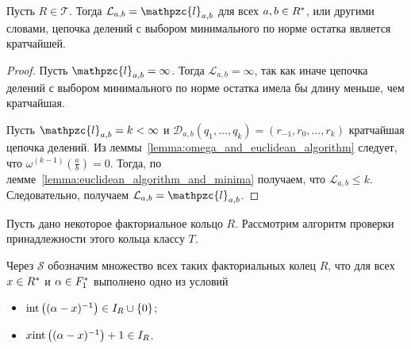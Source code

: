 \documentclass[_00_dissertation.tex]{subfiles}
\begin{document}
\begin{theorem}\label{theorem:Kroneker_Vahlen_theorem_in_UFD}
    Пусть $R \in \mathcal{T}$.
    Тогда $\mathcal{L}_{a, b} = \mathpzc{l}_{a, b}$ для всех $a, b \in R^{*}$, или другими словами, цепочка делений с выбором минимального по норме остатка является кратчайшей.
\end{theorem}
\begin{proof}
    Пусть $\mathpzc{l}_{a, b} = \infty$.
    Тогда $\mathcal{L}_{a, b} = \infty$, так как иначе цепочка делений с выбором минимального по норме остатка имела бы длину меньше, чем кратчайшая.

    Пусть $\mathpzc{l}_{a, b} = k < \infty$ и $\mathcal{D}_{a, b}(q_1, \dots, q_k) = (r_{-1}, r_0, \dots, r_k)$ кратчайшая цепочка делений.
    Из леммы~\ref{lemma:omega_and_euclidean_algorithm} следует, что $\omega^{(k-1)}\left(\frac{a}{b}\right) = 0$.
    Тогда, по лемме~\ref{lemma:euclidean_algorithm_and_minima} получаем, что $\mathcal{L}_{a, b} \le k$.
    Следовательно, получаем $\mathcal{L}_{a, b} = \mathpzc{l}_{a, b}$.
\end{proof}


Пусть дано некоторое факториальное кольцо $R$.
Рассмотрим алгоритм проверки принадлежности этого кольца классу $T$.

\begin{definition}
    Через $\mathcal{S}$ обозначим множество всех таких факториальных колец $R$, что для всех $x \in R^{*}$ и $\alpha \in F_1^{*}$ выполнено одно из условий
    \begin{itemize}
        \item $\textrm{int}\left((\alpha - x)^{-1}\right) \in I_{R} \cup \{0\}$;
        
        \item $x \textrm{int}\left((\alpha - x)^{-1}\right) + 1 \in I_{R}$.
    \end{itemize}
\end{definition}
\end{document}
